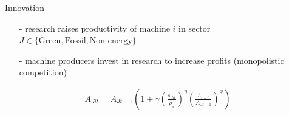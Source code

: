 \documentclass[11pt,aspectratio=169]{beamer}
\begin{document}
\begin{frame}{\hyperlink{modma}{Innovation}}
	\hypertarget{backinnov}{}
	\vspace{-2mm}
	\begin{itemize}[<+->]
		\item[-] research raises productivity of machine $i$ in sector $J\in\{\text{Green},\text{Fossil},\text{Non-energy}\}$ \vspace{-1mm}
		\item[-] machine producers invest in research to increase profits \small{(monopolistic competition)}
		\vspace{-1mm}
		\normalsize
	\end{itemize}
\pause
	\vspace{-1.4mm}
	\large
	\begin{align*}
		A_{Jit}={A_{Jt-1}}\left(1+\gamma\left(\frac{s_{Jit}}{\rho_J}\right)^\eta\left(\frac{A_{t-1}}{A_{Jt-1}}\right)^\phi\right)
	\end{align*}
	\normalsize
	\vspace{-1.9mm}
	\begin{enumerate}
	\item[] \  %
	\vspace{-1mm}
	\item[] \  %
	\vspace{-1mm}
	\item[] \
\end{enumerate}
\small
\vspace{4mm}
\hspace{-2mm}
\begin{minipage}[t!]{0.46\textwidth}
	\vspace{0mm}

\end{minipage}
\end{frame}
\end{document}
